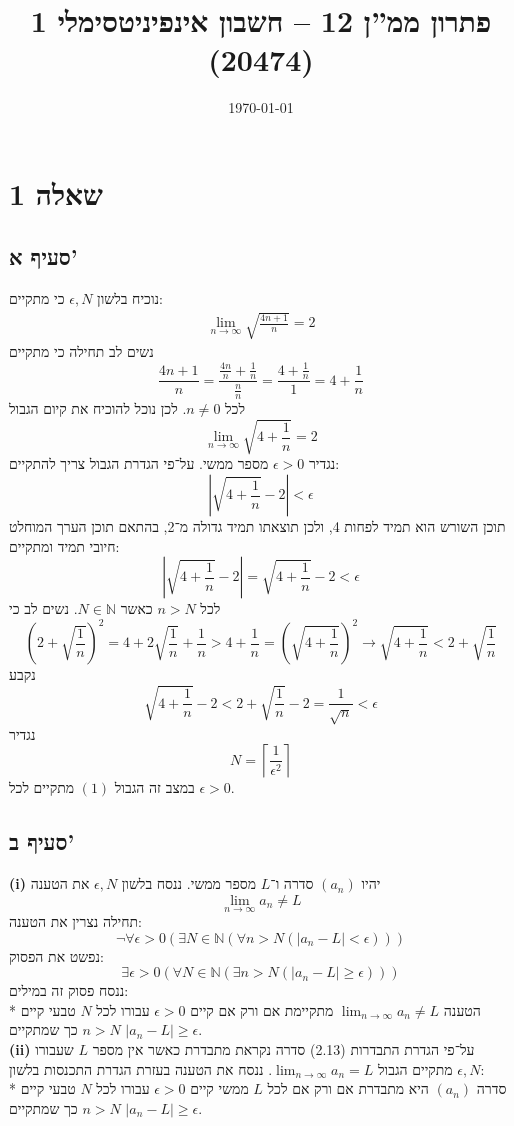 \documentclass[a4paper]{article}
\title{פתרון ממ''ן 12 – חשבון אינפיניטסימלי 1 (20474)}
\author{\AUTHOR}
\date\today
\def\NN{\mathbb{N}}
\begin{document}
\maketitle
\section{שאלה 1}
\subsection{סעיף א'}
נוכיח בלשון $\epsilon, N$ כי מתקיים:
\begin{align}
	\lim_{n \to \infty} \sqrt{\frac{4n + 1}{n}} = 2
\end{align}
נשים לב תחילה כי מתקיים
\[
	\frac{4n + 1}{n}
	= \frac{\frac{4n}{n} + \frac{1}{n}}{\frac{n}{n}}
	= \frac{4 + \frac{1}{n}}{1}
	= 4 + \frac{1}{n}
\]
לכל $n \ne 0$. לכן נוכל להוכיח את קיום הגבול
\[
	\lim_{n \to \infty} \sqrt{4 + \frac{1}{n}} = 2
\]
נגדיר $\epsilon > 0$ מספר ממשי. על־פי הגדרת הגבול צריך להתקיים:
\[
	\left| \sqrt{4 + \frac{1}{n}} - 2 \right| < \epsilon
\]
תוכן השורש הוא תמיד לפחות 4, ולכן תוצאתו תמיד גדולה מ־2, בהתאם תוכן הערך המוחלט חיובי תמיד ומתקיים:
\[
	\left| \sqrt{4 + \frac{1}{n}} - 2 \right|
	= \sqrt{4 + \frac{1}{n}} - 2 < \epsilon
\]
לכל $n > N$ כאשר $N \in \NN$. נשים לב כי
\[
	{\left(2 + \sqrt{\frac{1}{n}}\right)}^2 = 4 + 2\sqrt{\frac{1}{n}} + \frac{1}{n} > 4 + \frac{1}{n} = {\left(\sqrt{4 + \frac{1}{n}}\right)}^2
	\rightarrow \sqrt{4 + \frac{1}{n}} < 2 + \sqrt{\frac{1}{n}}
\]
נקבע
\[
	\sqrt{4 + \frac{1}{n}} - 2 < 2 + \sqrt{\frac{1}{n}} - 2 = \frac{1}{\sqrt{n}} < \epsilon
\]
נגדיר \[
	N = \left\lceil \frac{1}{\epsilon^2} \right\rceil
\]
במצב זה הגבול $(1)$ מתקיים לכל $\epsilon > 0$.

\subsection{סעיף ב'}
\textbf{(i)}
יהיו $(a_n)$ סדרה ו־$L$ מספר ממשי. ננסח בלשון $\epsilon, N$ את הטענה
\[
	\lim_{n \to \infty} a_n \ne L
\]
תחילה נצרין את הטענה:
\[
	\lnot \forall \epsilon > 0 (
	\exists N \in \NN (
	\forall n > N (\left| a_n - L \right| < \epsilon)))
\]
נפשט את הפסוק:
\[
	\exists \epsilon > 0 (
	\forall N \in \NN (
	\exists n > N (\left| a_n - L \right| \ge \epsilon)))
\]
ננסח פסוק זה במילים: \\*
הטענה $\lim_{n \to \infty} a_n \ne L$ מתקיימת אם ורק אם
קיים $\epsilon > 0$ עבורו לכל $N$ טבעי קיים $n > N$
כך שמתקיים $\left| a_n - L \right| \ge \epsilon$. \\
\textbf{(ii)}
על־פי הגדרת התבדרות (2.13) סדרה נקראת מתבדרת כאשר אין מספר $L$
שעבורו מתקיים הגבול $\lim_{n \to \infty} a_n = L$.
ננסח את הטענה בעזרת הגדרת התכנסות בלשון $\epsilon, N$: \\*
סדרה $(a_n)$ היא מתבדרת אם ורק אם
לכל $L$ ממשי קיים $\epsilon > 0$ עבורו לכל $N$ טבעי קיים $n > N$
כך שמתקיים $\left| a_n - L \right| \ge \epsilon$.
\end{document}
